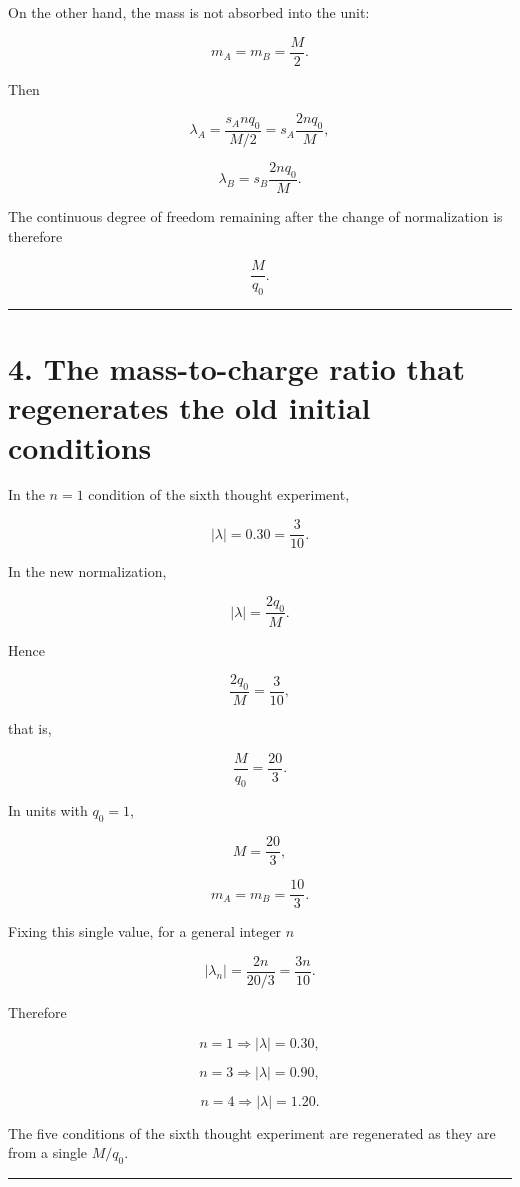 \documentclass[
  a4paper,
]{article}
\begin{document}
On the other hand, the mass is not absorbed into the unit:

\[
m_A=m_B=\frac{M}{2}.
\]

Then

\[
\lambda_A
=
\frac{s_A n q_0}{M/2}
=
s_A\frac{2nq_0}{M},
\]

\[
\lambda_B
=
s_B\frac{2nq_0}{M}.
\]

The continuous degree of freedom remaining after the change of
normalization is therefore

\[
\boxed{\frac{M}{q_0}}.
\]

\begin{center}\rule{0.5\linewidth}{0.5pt}\end{center}

\section{4. The mass-to-charge ratio that regenerates the old initial
conditions}\label{the-mass-to-charge-ratio-that-regenerates-the-old-initial-conditions}

In the \(n=1\) condition of the sixth thought experiment,

\[
|\lambda|=0.30=\frac{3}{10}.
\]

In the new normalization,

\[
|\lambda|
=
\frac{2q_0}{M}.
\]

Hence

\[
\frac{2q_0}{M}=\frac{3}{10},
\]

that is,

\[
\boxed{\frac{M}{q_0}=\frac{20}{3}}.
\]

In units with \(q_0=1\),

\[
\boxed{M=\frac{20}{3}},
\]

\[
\boxed{m_A=m_B=\frac{10}{3}}.
\]

Fixing this single value, for a general integer \(n\)

\[
|\lambda_n|
=
\frac{2n}{20/3}
=
\frac{3n}{10}.
\]

Therefore

\[
n=1\Rightarrow |\lambda|=0.30,
\]

\[
n=3\Rightarrow |\lambda|=0.90,
\]

\[
n=4\Rightarrow |\lambda|=1.20.
\]

The five conditions of the sixth thought experiment are regenerated as
they are from a single \(M/q_0\).

\begin{center}\rule{0.5\linewidth}{0.5pt}\end{center}
\end{document}
